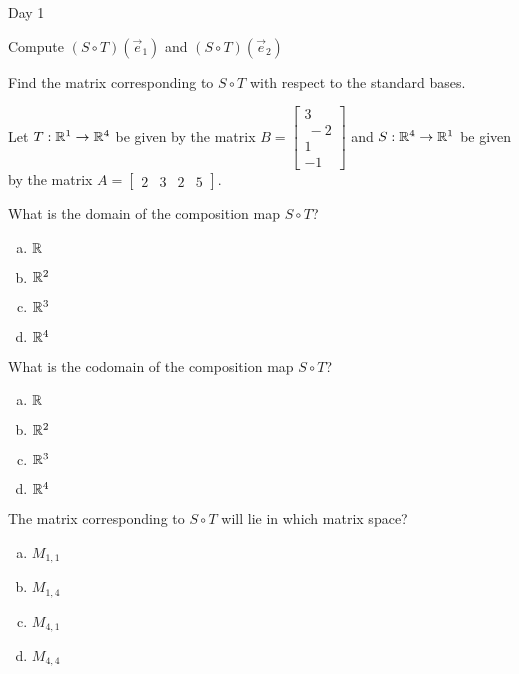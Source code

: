 \begin{applicationActivities}{Day 1}
\begin{activity}
Compute $(S \circ T)(\vec{e}_1)$ and $(S \circ T)(\vec{e}_2)$
\end{activity}

\begin{activity}
Find the matrix corresponding to $S \circ T$ with respect to the standard bases.
\end{activity}

\begin{activity}
Let $T: \mathbb{R}^1 \rightarrow \mathbb{R}^4$ be given by the matrix $B=\begin{bmatrix} 3 \\\ -2 \\ 1 \\ -1\end{bmatrix}$ and $S: \mathbb{R}^4 \rightarrow \mathbb{R}^1$ be given by the matrix $A=\begin{bmatrix}2 & 3 & 2 & 5 \end{bmatrix}$.

What is the domain of the composition map $S \circ T$?
\begin{enumerate}[(a)]
\item $\mathbb{R}$
\item $\mathbb{R}^2$
\item $\mathbb{R}^3$
\item $\mathbb{R}^4$
\end{enumerate}
\end{activity}

\begin{activity}
What is the codomain of the composition map $S \circ T$?
\begin{enumerate}[(a)]
\item $\mathbb{R}$
\item $\mathbb{R}^2$
\item $\mathbb{R}^3$
\item $\mathbb{R}^4$
\end{enumerate}
\end{activity}

\begin{activity}
The matrix corresponding to $S \circ T$ will lie in which matrix space?
\begin{enumerate}[(a)]
\item $M_{1,1}$
\item $M_{1,4}$
\item $M_{4,1}$
\item $M_{4,4}$
\end{enumerate}
\end{activity}


\end{applicationActivities}

